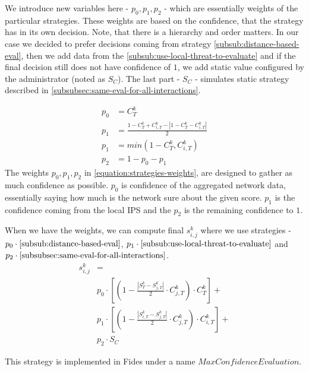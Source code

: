 We introduce new variables here - $p_{0}, p_{1}, p_{2}$ - which are essentially weights of the particular strategies. These weights are based on the confidence, that the strategy has in its own decision.
Note, that there is a hierarchy and order matters. 
In our case we decided to prefer decisions coming from strategy \ref{subsub:distance-based-eval}, then we add data from the \ref{subsub:use-local-threat-to-evaluate} and if the final decision still does not have confidence of $1$, we add static value configured by the administrator (noted as $S_{C}$). 
The last part - $S_{C}$ - simulates static strategy described in \ref{subsubsec:same-eval-for-all-interactions}.

\begin{equation}
\label{equation:strategies-weights}
\begin{split}
    p_{0} &= {C}^{k}_{T} \\
    p_{1} &= \frac{1 - {C}^{k}_{T} + {C}^{k}_{i, T} - |1 - {C}^{k}_{T} - {C}^{k}_{i, T}|}{2} \\
    p_{1} &= min(1 - {C}^{k}_{T}, {C}^{k}_{i, T}) \\
    p_{2} &= 1 - p_{0} - p_{1}
\end{split}
\end{equation}
The weights $p_{0}, p_{1}, p_{2}$ in \ref{equation:strategies-weights}, are designed to gather as much confidence as possible. $p_{0}$ is confidence of the aggregated network data, essentially saying how much is the network sure about the given score. 
$p_{1}$ is the confidence coming from the local IPS and the $p_{2}$ is the remaining confidence to $1$.

When we have the weights, we can compute final $s^{k}_{i, j}$ where we use strategies - $p_{0} \cdot \ref{subsub:distance-based-eval}$, $p_{1} \cdot \ref{subsub:use-local-threat-to-evaluate}$ and $p_{2} \cdot \ref{subsubsec:same-eval-for-all-interactions}$. 
\begin{equation}
\begin{split}
    s^{k}_{i, j} &= \\
    &p_{0} \cdot [(1 - \frac{|{S}^{k}_{T} - S^{k}_{j, T}|}{2} \cdot C^{k}_{j, T}) \cdot C^{k}_{T}] + \\
    &p_{1} \cdot [(1 - \frac{|{S}^{k}_{i, T} - S^{k}_{j, T}|}{2} \cdot C^{k}_{j, T}) \cdot C^{k}_{i, T}] + \\
    &p_{2} \cdot S_{C}
\end{split}
\end{equation}

\noindent
This strategy is implemented in Fides under a name $MaxConfidenceEvaluation$.
